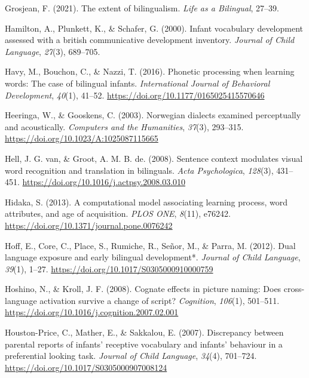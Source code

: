 \documentclass[
]{article}
\newlength{\cslhangindent}
\newlength{\cslentryspacingunit} %
\newenvironment{CSLReferences}[2] %
 {%
  \setlength{\parindent}{0pt}
  \ifodd #1
  \let\oldpar\par
  \def\par{\hangindent=\cslhangindent\oldpar}
  \fi
  \setlength{\parskip}{#2\cslentryspacingunit}
 }%
 {}
\begin{document}
\begin{CSLReferences}{1}{0}
\leavevmode{}%
Grosjean, F. (2021). The extent of bilingualism. \emph{Life as a
Bilingual}, 27--39.

\leavevmode{}%
Hamilton, A., Plunkett, K., \& Schafer, G. (2000). Infant vocabulary
development assessed with a british communicative development inventory.
\emph{Journal of Child Language}, \emph{27}(3), 689--705.

\leavevmode{}%
Havy, M., Bouchon, C., \& Nazzi, T. (2016). Phonetic processing when
learning words: The case of bilingual infants. \emph{International
Journal of Behavioral Development}, \emph{40}(1), 41--52.
\url{https://doi.org/10.1177/0165025415570646}

\leavevmode{}%
Heeringa, W., \& Gooskens, C. (2003). Norwegian dialects examined
perceptually and acoustically. \emph{Computers and the Humanities},
\emph{37}(3), 293--315. \url{https://doi.org/10.1023/A:1025087115665}

\leavevmode{}%
Hell, J. G. van, \& Groot, A. M. B. de. (2008). Sentence context
modulates visual word recognition and translation in bilinguals.
\emph{Acta Psychologica}, \emph{128}(3), 431--451.
\url{https://doi.org/10.1016/j.actpsy.2008.03.010}

\leavevmode{}%
Hidaka, S. (2013). A computational model associating learning process,
word attributes, and age of acquisition. \emph{{PLOS} {ONE}},
\emph{8}(11), e76242. \url{https://doi.org/10.1371/journal.pone.0076242}

\leavevmode{}%
Hoff, E., Core, C., Place, S., Rumiche, R., Señor, M., \& Parra, M.
(2012). Dual language exposure and early bilingual development*.
\emph{Journal of Child Language}, \emph{39}(1), 1--27.
\url{https://doi.org/10.1017/S0305000910000759}

\leavevmode{}%
Hoshino, N., \& Kroll, J. F. (2008). Cognate effects in picture naming:
Does cross-language activation survive a change of script?
\emph{Cognition}, \emph{106}(1), 501--511.
\url{https://doi.org/10.1016/j.cognition.2007.02.001}

\leavevmode{}%
Houston-Price, C., Mather, E., \& Sakkalou, E. (2007). Discrepancy
between parental reports of infants' receptive vocabulary and infants'
behaviour in a preferential looking task. \emph{Journal of Child
Language}, \emph{34}(4), 701--724.
\url{https://doi.org/10.1017/S0305000907008124}


\end{CSLReferences}
\end{document}
